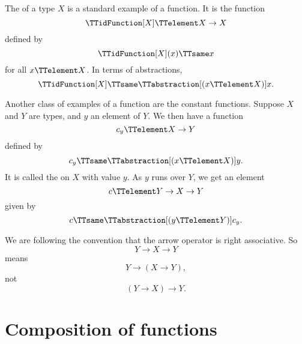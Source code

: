 \documentclass{article}
\begin{document}
The  of a type $X$ is a standard
example of a function.  It is the function
\begin{equation*}
  \TTidFunction[X] \TTelement X \to X
\end{equation*}
defined by
\begin{equation*}
  \TTidFunction[X] (x) \TTsame x
\end{equation*}
for all $x \TTelement X$.  In terms of abstractions,
\begin{equation*}
  \TTidFunction[X] \TTsame \TTabstraction[(x \TTelement X)] x.
\end{equation*}

Another class of examples of a function are the constant functions.
Suppose $X$ and $Y$ are types, and $y$ an element of $Y$.  We then
have a function
\begin{equation*}
  c_y \TTelement X \to Y
\end{equation*}
defined by
\begin{equation*}
  c_y \TTsame \TTabstraction[(x \TTelement X)] y.
\end{equation*}
It is called the  on $X$ with value
$y$.  As $y$ runs over $Y$, we get an element
\begin{equation*}
  c \TTelement Y \to X \to Y
\end{equation*}
given by
\begin{equation*}
  c \TTsame \TTabstraction[(y \TTelement Y)] c_y.
\end{equation*}

We are following the convention that the arrow operator is right
associative.  So
\begin{equation*}
  Y \to X \to Y
\end{equation*}
means
\begin{equation*}
  Y \to (X \to Y),
\end{equation*}
not
\begin{equation*}
  (Y \to X) \to Y.
\end{equation*}

\section{Composition of functions}
\label{sec:comp-funct}
\end{document}

